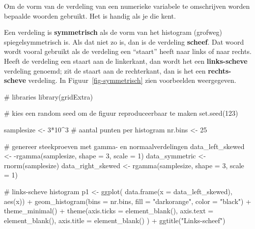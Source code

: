 \documentclass[
  a4paper,
]{scrbook}
\newenvironment{Shaded}{\begin{snugshade}}{\end{snugshade}}
\newcommand{\AttributeTok}[1]{\textcolor[rgb]{0.40,0.45,0.13}{#1}}
\newcommand{\CommentTok}[1]{\textcolor[rgb]{0.37,0.37,0.37}{#1}}
\newcommand{\DecValTok}[1]{\textcolor[rgb]{0.68,0.00,0.00}{#1}}
\newcommand{\FunctionTok}[1]{\textcolor[rgb]{0.28,0.35,0.67}{#1}}
\newcommand{\NormalTok}[1]{\textcolor[rgb]{0.00,0.23,0.31}{#1}}
\newcommand{\OtherTok}[1]{\textcolor[rgb]{0.00,0.23,0.31}{#1}}
\newcommand{\SpecialCharTok}[1]{\textcolor[rgb]{0.37,0.37,0.37}{#1}}
\newcommand{\StringTok}[1]{\textcolor[rgb]{0.13,0.47,0.30}{#1}}
\theoremstyle{definition}
\theoremstyle{definition}
\theoremstyle{remark}
\begin{document}
Om de vorm van de verdeling van een numerieke variabele te omschrijven
worden bepaalde woorden gebruikt. Het is handig als je die kent.

Een verdeling is \textbf{symmetrisch} als de vorm van het histogram
(grofweg) spiegelsymmetrisch is. Als dat niet zo is, dan is de verdeling
\textbf{scheef}. Dat woord wordt vooral gebruikt als de verdeling een
``staart'' heeft naar links of naar rechts. Heeft de verdeling een
staart aan de linkerkant, dan wordt het een \textbf{links-scheve}
verdeling genoemd; zit de staart aan de rechterkant, dan is het een
\textbf{rechts-scheve} verdeling. In Figuur~\ref{fig-symmetrisch} zien
voorbeelden weergegeven.

\begin{Shaded}
\begin{Highlighting}[]
\CommentTok{\# libraries}
\FunctionTok{library}\NormalTok{(gridExtra)}

\CommentTok{\# kies een random seed om de figuur reproduceerbaar te maken}
\FunctionTok{set.seed}\NormalTok{(}\DecValTok{123}\NormalTok{)}

\NormalTok{samplesize }\OtherTok{\textless{}{-}} \DecValTok{3}\SpecialCharTok{*}\DecValTok{10}\SpecialCharTok{\^{}}\DecValTok{3} \CommentTok{\# aantal punten per histogram}
\NormalTok{nr.bins }\OtherTok{\textless{}{-}} \DecValTok{25}

\CommentTok{\# genereer steekproeven met gamma{-} en normaalverdelingen}
\NormalTok{data\_left\_skewed }\OtherTok{\textless{}{-}} \SpecialCharTok{{-}}\FunctionTok{rgamma}\NormalTok{(samplesize, }\AttributeTok{shape =} \DecValTok{3}\NormalTok{, }\AttributeTok{scale =} \DecValTok{1}\NormalTok{)}
\NormalTok{data\_symmetric }\OtherTok{\textless{}{-}} \FunctionTok{rnorm}\NormalTok{(samplesize)}
\NormalTok{data\_right\_skewed }\OtherTok{\textless{}{-}} \FunctionTok{rgamma}\NormalTok{(samplesize, }\AttributeTok{shape =} \DecValTok{3}\NormalTok{, }\AttributeTok{scale =} \DecValTok{1}\NormalTok{)}

\CommentTok{\# links{-}scheve histogram}
\NormalTok{p1 }\OtherTok{\textless{}{-}} \FunctionTok{ggplot}\NormalTok{(}
  \FunctionTok{data.frame}\NormalTok{(}\AttributeTok{x =}\NormalTok{ data\_left\_skewed), }\FunctionTok{aes}\NormalTok{(x)) }\SpecialCharTok{+}
  \FunctionTok{geom\_histogram}\NormalTok{(}\AttributeTok{bins =}\NormalTok{ nr.bins, }\AttributeTok{fill =} \StringTok{"darkorange"}\NormalTok{, }\AttributeTok{color =} \StringTok{"black"}\NormalTok{) }\SpecialCharTok{+}
  \FunctionTok{theme\_minimal}\NormalTok{() }\SpecialCharTok{+}
  \FunctionTok{theme}\NormalTok{(}\AttributeTok{axis.ticks =} \FunctionTok{element\_blank}\NormalTok{(),}
        \AttributeTok{axis.text =} \FunctionTok{element\_blank}\NormalTok{(),}
        \AttributeTok{axis.title =} \FunctionTok{element\_blank}\NormalTok{()}
\NormalTok{        ) }\SpecialCharTok{+}
  \FunctionTok{ggtitle}\NormalTok{(}\StringTok{"Links{-}scheef"}\NormalTok{)}


\end{Highlighting}
\end{Shaded}
\end{document}
